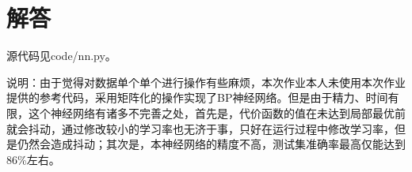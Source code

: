\documentclass{article}
\begin{document}
\section*{解答} %
\label{sec:解答}
	源代码见code/nn.py。

	说明：由于觉得对数据单个单个进行操作有些麻烦，本次作业本人未使用本次作业提供的参考代码，采用矩阵化的操作实现了BP神经网络。但是由于精力、时间有限，这个神经网络有诸多不完善之处，首先是，代价函数的值在未达到局部最优前就会抖动，通过修改较小的学习率也无济于事，只好在运行过程中修改学习率，但是仍然会造成抖动；其次是，本神经网络的精度不高，测试集准确率最高仅能达到86\%左右。
\end{document}

